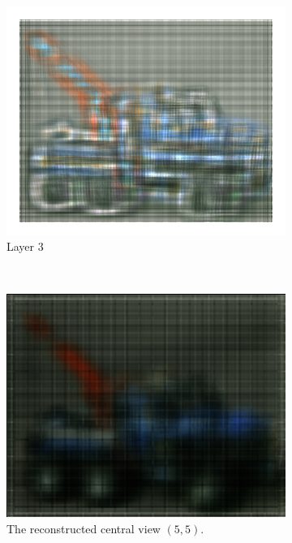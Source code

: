 \documentclass[11pt,a4paper,titlepage]{article}
\begin{document}
\begin{figure}[h]
\begin{subfigure}[c]{0.3\textwidth}
		\includegraphics[width=\textwidth]{results/legotruck_perspective_rec_3Layers_r=1/3.png}
		\caption{Layer 3}
	\end{subfigure}%
	\\
	\begin{subfigure}[t]{0.4\textwidth}
		\includegraphics[width=\textwidth]{results/legotruck_perspective_rec_3Layers_r=1/central_view_reconstruction5-5.png}
		\caption{The reconstructed central view $\left( 5, 5 \right)$.}
	\end{subfigure}%
	~
	\begin{subfigure}[t]{0.4\textwidth}

\end{subfigure}
\end{figure}
\end{document}
